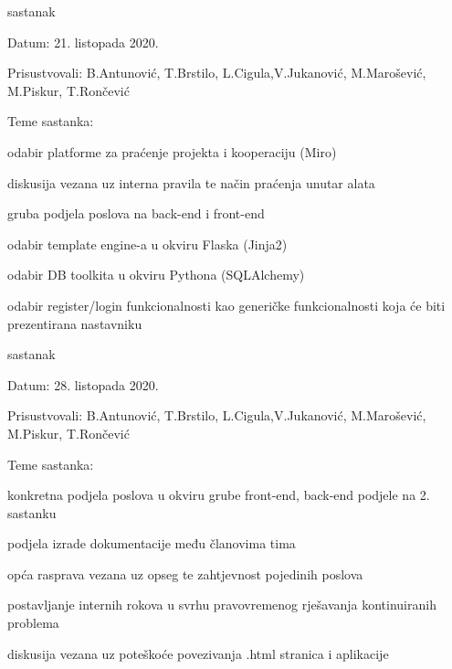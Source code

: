 \begin{packed_enum}
			\item  sastanak
			\item[] \begin{packed_item}
				\item Datum: 21. listopada 2020.
				\item Prisustvovali: B.Antunović, T.Brstilo, L.Cigula,V.Jukanović, M.Marošević, M.Piskur, T.Rončević
				\item Teme sastanka:
				\begin{packed_item}
					\item  odabir platforme za praćenje projekta i kooperaciju (Miro)
					\item  diskusija vezana uz interna pravila te način praćenja unutar alata
					\item  gruba podjela poslova na back-end i front-end
					\item  odabir template engine-a u okviru Flaska (Jinja2)
					\item  odabir DB toolkita u okviru Pythona (SQLAlchemy)
					\item  odabir register/login funkcionalnosti kao generičke funkcionalnosti koja će biti prezentirana nastavniku
				\end{packed_item}
			\end{packed_item}
			
			\item  sastanak
			\item[] \begin{packed_item}
				\item Datum: 28. listopada 2020.
				\item Prisustvovali: B.Antunović, T.Brstilo, L.Cigula,V.Jukanović, M.Marošević, M.Piskur, T.Rončević
				\item Teme sastanka:
				\begin{packed_item}
					\item  konkretna podjela poslova u okviru grube front-end, back-end podjele na 2. sastanku
					\item  podjela izrade dokumentacije među članovima tima
					\item  opća rasprava vezana uz opseg te zahtjevnost pojedinih poslova
					\item  postavljanje internih rokova u svrhu pravovremenog rješavanja kontinuiranih problema
					\item  diskusija vezana uz poteškoće povezivanja .html stranica i aplikacije
				\end{packed_item}
			\end{packed_item}			
			

\end{packed_enum}

